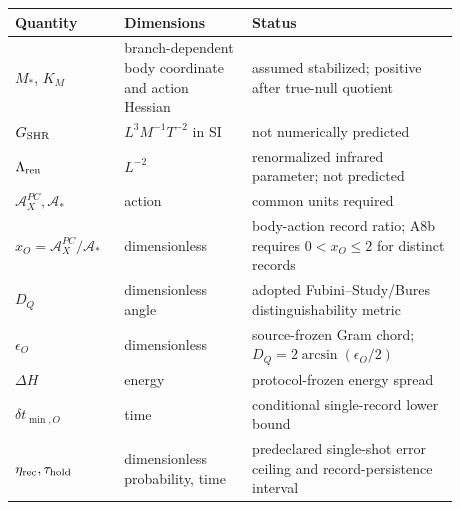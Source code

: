 \documentclass[11pt]{article}
\begin{document}
\begin{center}
\small
\begin{tabular}{L{0.20\linewidth}L{0.26\linewidth}L{0.42\linewidth}}
\toprule
Quantity & Dimensions & Status\\
\midrule
\(M_*\), \(K_M\) & branch-dependent body coordinate and action Hessian &
assumed stabilized; positive after true-null quotient\\
\(G_{\rm SHR}\) & \(L^3M^{-1}T^{-2}\) in SI & not numerically predicted\\
\(\Lambda_{\rm ren}\) & \(L^{-2}\) & renormalized infrared parameter; not predicted\\
\(\mathcal A_X^{PC},\mathcal A_*\) & action & common units required\\
\(x_O=\mathcal A_X^{PC}/\mathcal A_*\) & dimensionless &
body-action record ratio; A8b requires \(0<x_O\leq2\) for distinct records\\
\(D_Q\) & dimensionless angle & adopted Fubini--Study/Bures distinguishability metric\\
\(\epsilon_O\) & dimensionless & source-frozen Gram chord; \(D_Q=2\arcsin(\epsilon_O/2)\)\\
\(\Delta H\) & energy & protocol-frozen energy spread\\
\(\delta t_{\min,O}\) & time & conditional single-record lower bound\\
\(\eta_{\rm rec},\tau_{\rm hold}\) & dimensionless probability, time &
predeclared single-shot error ceiling and record-persistence interval\\
\bottomrule
\end{tabular}
\end{center}
\end{document}
